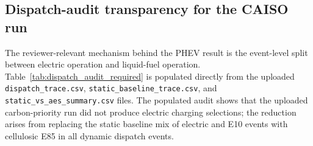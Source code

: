 \documentclass[cleantechnol,article,submit,pdftex,moreauthors]{Definitions/mdpi}
\begin{document}
\subsection{Dispatch-audit transparency for the CAISO run}
\label{subsec:dispatch_audit}

The reviewer-relevant mechanism behind the PHEV result is the event-level split between electric operation and liquid-fuel operation. Table~\ref{tab:dispatch_audit_required} is populated directly from the uploaded \texttt{dispatch\_trace.csv}, \texttt{static\_baseline\_trace.csv}, and \texttt{static\_vs\_aes\_summary.csv} files. The populated audit shows that the uploaded carbon-priority run did not produce electric charging selections; the reduction arises from replacing the static baseline mix of electric and E10 events with cellulosic E85 in all dynamic dispatch events.
\end{document}
